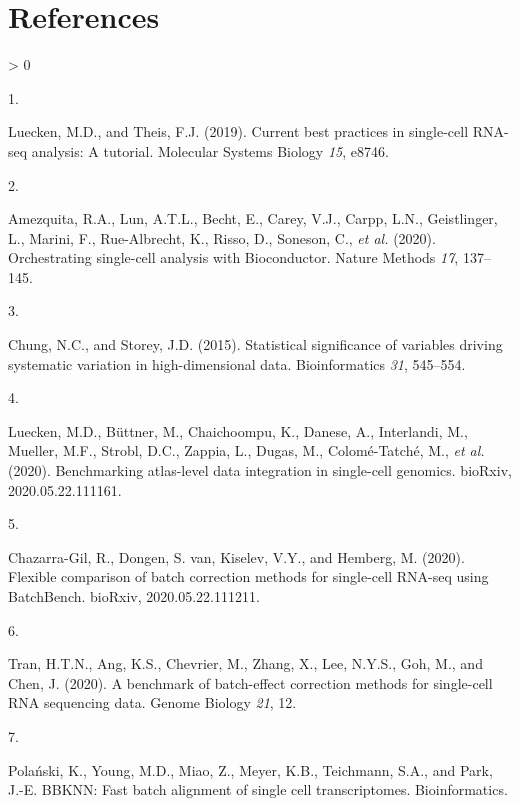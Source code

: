 \documentclass[
]{article}
\newlength{\cslhangindent}
\newlength{\csllabelwidth}
\newenvironment{CSLReferences}[2] %
 {%
  \setlength{\parindent}{0pt}
  \ifodd #1 \everypar{\setlength{\hangindent}{\cslhangindent}}\ignorespaces\fi
  \ifnum #2 > 0
  \setlength{\parskip}{#2\baselineskip}
  \fi
 }%
 {}
\newcommand{\CSLLeftMargin}[1]{\parbox[t]{\csllabelwidth}{#1}}
\newcommand{\CSLRightInline}[1]{\parbox[t]{\linewidth - \csllabelwidth}{#1}\break}
\begin{document}
\newpage

\hypertarget{references}{%
\section*{References}\label{references}}

\hypertarget{refs}{}
\begin{CSLReferences}{0}{0}
\leavevmode\hypertarget{ref-lueckenCurrentBestPractices2019}{}%
\CSLLeftMargin{1. }
\CSLRightInline{Luecken, M.D., and Theis, F.J. (2019). Current best practices in single-cell {RNA}-seq analysis: A tutorial. Molecular Systems Biology \emph{15}, e8746.}

\leavevmode\hypertarget{ref-amezquitaOrchestratingSinglecellAnalysis2020}{}%
\CSLLeftMargin{2. }
\CSLRightInline{Amezquita, R.A., Lun, A.T.L., Becht, E., Carey, V.J., Carpp, L.N., Geistlinger, L., Marini, F., Rue-Albrecht, K., Risso, D., Soneson, C., \emph{et al.} (2020). Orchestrating single-cell analysis with {Bioconductor}. Nature Methods \emph{17}, 137--145.}

\leavevmode\hypertarget{ref-chungStatisticalSignificanceVariables2015}{}%
\CSLLeftMargin{3. }
\CSLRightInline{Chung, N.C., and Storey, J.D. (2015). Statistical significance of variables driving systematic variation in high-dimensional data. Bioinformatics \emph{31}, 545--554.}

\leavevmode\hypertarget{ref-lueckenBenchmarkingAtlaslevelData2020}{}%
\CSLLeftMargin{4. }
\CSLRightInline{Luecken, M.D., Büttner, M., Chaichoompu, K., Danese, A., Interlandi, M., Mueller, M.F., Strobl, D.C., Zappia, L., Dugas, M., Colomé-Tatché, M., \emph{et al.} (2020). Benchmarking atlas-level data integration in single-cell genomics. bioRxiv, 2020.05.22.111161.}

\leavevmode\hypertarget{ref-chazarra-gilFlexibleComparisonBatch2020}{}%
\CSLLeftMargin{5. }
\CSLRightInline{Chazarra-Gil, R., Dongen, S. van, Kiselev, V.Y., and Hemberg, M. (2020). Flexible comparison of batch correction methods for single-cell {RNA}-seq using {BatchBench}. bioRxiv, 2020.05.22.111211.}

\leavevmode\hypertarget{ref-tranBenchmarkBatcheffectCorrection2020}{}%
\CSLLeftMargin{6. }
\CSLRightInline{Tran, H.T.N., Ang, K.S., Chevrier, M., Zhang, X., Lee, N.Y.S., Goh, M., and Chen, J. (2020). A benchmark of batch-effect correction methods for single-cell {RNA} sequencing data. Genome Biology \emph{21}, 12.}

\leavevmode\hypertarget{ref-polanskiBBKNNFastBatch}{}%
\CSLLeftMargin{7. }
\CSLRightInline{Polański, K., Young, M.D., Miao, Z., Meyer, K.B., Teichmann, S.A., and Park, J.-E. {BBKNN}: Fast batch alignment of single cell transcriptomes. Bioinformatics.}


\end{CSLReferences}
\end{document}
